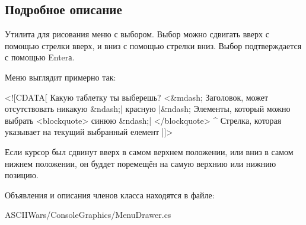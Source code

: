 \subsection{Подробное описание}
Утилита для рисования меню с выбором. Выбор можно сдвигать вверх с помощью стрелки вверх, и вниз с помощью стрелки вниз. Выбор подтверждается с помощью Enter\textquotesingle{}а. 

Меню выглядит примерно так\+: 
\begin{DoxyCode}
<![CDATA[
 Какую таблетку ты выберешь?     <&mdash; Заголовок, может отсутствовать
   никакую &ndash;|
   красную   |&ndash; Элементы, который можно выбрать
<blockquote>
синюю   &ndash;|
</blockquote>
 ^
Стрелка, которая указывает на текущий выбранный елемент
]]>
\end{DoxyCode}


Если курсор был сдвинут вверх в самом верхнем положении, или вниз в самом нижнем положении, он буддет поремещён на самую верхнию или нижнию позицию.

Объявления и описания членов класса находятся в файле\+:\begin{DoxyCompactItemize}
\item 
A\+S\+C\+I\+I\+Wars/\+Console\+Graphics/Menu\+Drawer.\+cs\end{DoxyCompactItemize}
